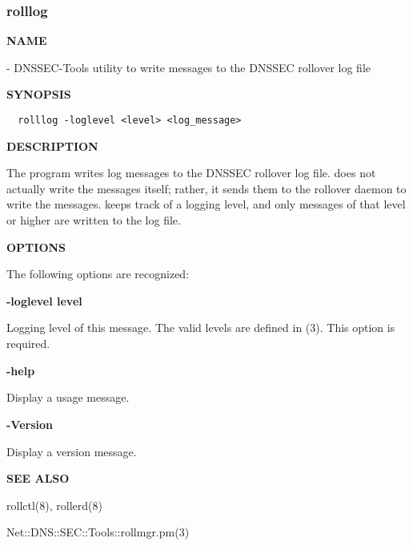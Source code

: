 \clearpage

\subsubsection{rolllog}

{\bf NAME}

 - DNSSEC-Tools utility to write messages to the DNSSEC rollover
log file

{\bf SYNOPSIS}

\begin{verbatim}
  rolllog -loglevel <level> <log_message>
\end{verbatim}

{\bf DESCRIPTION}

The  program writes log messages to the DNSSEC rollover log
file.   does not actually write the messages itself; rather,
it sends them to the  rollover daemon to write the messages.
 keeps track of a logging level, and only messages of that
level or higher are written to the log file.

{\bf OPTIONS}

The following options are recognized:

\begin{description}

\item {\bf -loglevel level}\verb" "

Logging level of this message.  The valid levels are defined in
(3).   This option is required.

\item {\bf -help}\verb" "

Display a usage message.

\item {\bf -Version}\verb" "

Display a version message.

\end{description}

{\bf SEE ALSO}

rollctl(8),
rollerd(8)

Net::DNS::SEC::Tools::rollmgr.pm(3)

